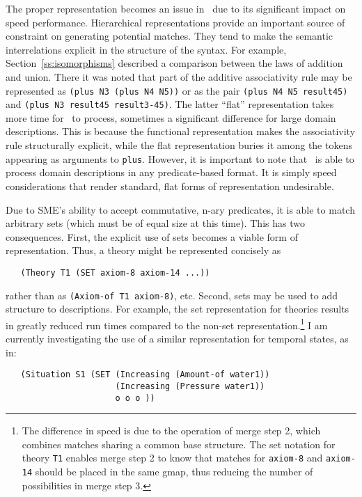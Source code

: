 The proper representation becomes an issue in \SME\ due to its significant
impact on speed performance. Hierarchical representations provide an
important source of constraint on generating potential matches. They tend to
make the semantic interrelations explicit in the structure of the syntax.
For example, Section~\ref{ss:isomorphisms} described a comparison between
the laws of addition and union. There it was noted that part of the additive
associativity rule may be represented as {\tt (plus N3 (plus N4 N5))} or as
the pair {\tt (plus N4 N5 result45)} and {\tt (plus N3 result45
result3-45)}. The latter ``flat'' representation takes more time for \SME\
to process, sometimes a significant difference for large domain
descriptions. This is because the functional representation makes the
associativity rule structurally explicit, while the flat representation
buries it among the tokens appearing as arguments to {\tt plus}. However, it
is important to note that \SME\ is able to process domain descriptions in
any predicate-based format. It is simply speed considerations that render
standard, flat forms of representation undesirable.

Due to SME's ability to accept commutative, n-ary predicates, it is able to
match arbitrary sets (which must be of equal size at this time). This has
two consequences. First, the explicit use of sets becomes a viable form of
representation. Thus, a theory might be represented concisely as

\begin{verbatim}
   (Theory T1 (SET axiom-8 axiom-14 ...))
\end{verbatim}

\noindent
rather than as {\tt (Axiom-of T1 axiom-8)}, etc. Second, sets may be used to
add structure to descriptions. For example, the set representation for
theories results in greatly reduced run times compared to the non-set
representation.\footnote{The difference in speed is due to the operation of
merge step 2, which combines matches sharing a common base structure. The
set notation for theory {\tt T1} enables merge step 2 to know that matches
for {\tt axiom-8} and {\tt axiom-14} should be placed in the same gmap, thus
reducing the number of possibilities in merge step 3.} I am currently
investigating the use of a similar representation for temporal states, as in:

\begin{verbatim}
   (Situation S1 (SET (Increasing (Amount-of water1))
                      (Increasing (Pressure water1))
                      o o o ))
\end{verbatim}


